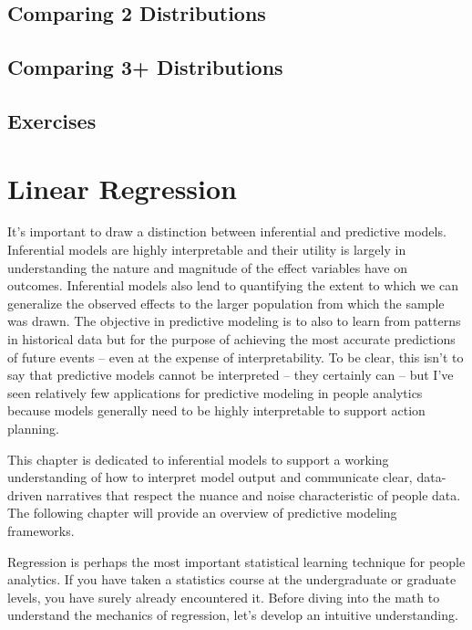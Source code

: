 \documentclass[]{book}
\begin{document}
\hypertarget{comparing-2-distributions}{%
\section{Comparing 2 Distributions}\label{comparing-2-distributions}}

\hypertarget{comparing-3-distributions}{%
\section{Comparing 3+ Distributions}\label{comparing-3-distributions}}

\hypertarget{exercises-5}{%
\section{Exercises}\label{exercises-5}}

\hypertarget{lm}{%
\chapter{Linear Regression}\label{lm}}

It's important to draw a distinction between inferential and predictive models. Inferential models are highly interpretable and their utility is largely in understanding the nature and magnitude of the effect variables have on outcomes. Inferential models also lend to quantifying the extent to which we can generalize the observed effects to the larger population from which the sample was drawn. The objective in predictive modeling is to also to learn from patterns in historical data but for the purpose of achieving the most accurate predictions of future events -- even at the expense of interpretability. To be clear, this isn't to say that predictive models cannot be interpreted -- they certainly can -- but I've seen relatively few applications for predictive modeling in people analytics because models generally need to be highly interpretable to support action planning.

This chapter is dedicated to inferential models to support a working understanding of how to interpret model output and communicate clear, data-driven narratives that respect the nuance and noise characteristic of people data. The following chapter will provide an overview of predictive modeling frameworks.

Regression is perhaps the most important statistical learning technique for people analytics. If you have taken a statistics course at the undergraduate or graduate levels, you have surely already encountered it. Before diving into the math to understand the mechanics of regression, let's develop an intuitive understanding.
\end{document}
